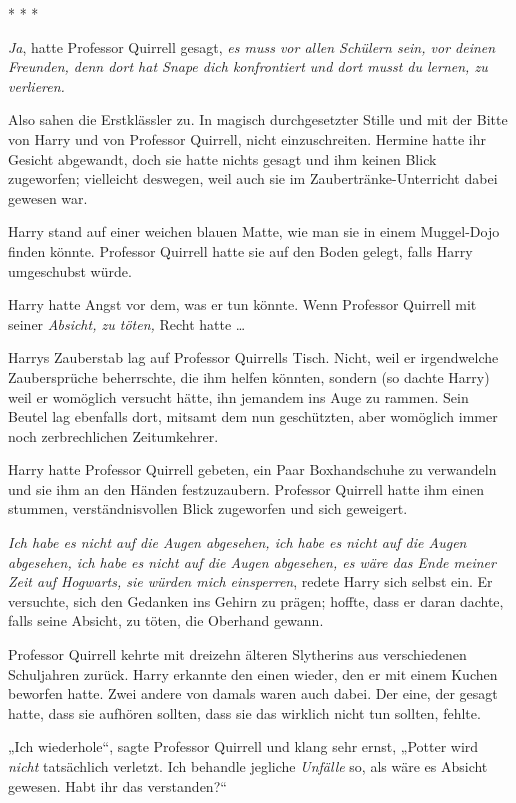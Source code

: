 {* * *

\emph{Ja}, hatte Professor Quirrell gesagt, \emph{es muss vor allen Schülern sein, vor deinen Freunden, denn dort hat Snape dich konfrontiert und dort musst du lernen, zu verlieren.}

Also sahen die Erstklässler zu. In magisch durchgesetzter Stille und mit der Bitte von Harry und von Professor Quirrell, nicht einzuschreiten. Hermine hatte ihr Gesicht abgewandt, doch sie hatte nichts gesagt und ihm keinen Blick zugeworfen; vielleicht deswegen, weil auch sie im Zaubertränke-Unterricht dabei gewesen war.

Harry stand auf einer weichen blauen Matte, wie man sie in einem Muggel-Dojo finden könnte. Professor Quirrell hatte sie auf den Boden gelegt, falls Harry umgeschubst würde.

Harry hatte Angst vor dem, was er tun könnte. Wenn Professor Quirrell mit seiner \emph{Absicht, zu töten,} Recht hatte …

Harrys Zauberstab lag auf Professor Quirrells Tisch. Nicht, weil er irgendwelche Zaubersprüche beherrschte, die ihm helfen könnten, sondern (so dachte Harry) weil er womöglich versucht hätte, ihn jemandem ins Auge zu rammen. Sein Beutel lag ebenfalls dort, mitsamt dem nun geschützten, aber womöglich immer noch zerbrechlichen Zeitumkehrer.

Harry hatte Professor Quirrell gebeten, ein Paar Boxhandschuhe zu verwandeln und sie ihm an den Händen festzuzaubern. Professor Quirrell hatte ihm einen stummen, verständnisvollen Blick zugeworfen und sich geweigert.

\emph{Ich habe es nicht auf die Augen abgesehen, ich habe es nicht auf die Augen abgesehen, ich habe es nicht auf die Augen abgesehen, es wäre das Ende meiner Zeit auf Hogwarts, sie würden mich einsperren}, redete Harry sich selbst ein. Er versuchte, sich den Gedanken ins Gehirn zu prägen; hoffte, dass er daran dachte, falls seine Absicht, zu töten, die Oberhand gewann.

Professor Quirrell kehrte mit dreizehn älteren Slytherins aus verschiedenen Schuljahren zurück. Harry erkannte den einen wieder, den er mit einem Kuchen beworfen hatte. Zwei andere von damals waren auch dabei. Der eine, der gesagt hatte, dass sie aufhören sollten, dass sie das wirklich nicht tun sollten, fehlte.

„Ich wiederhole“, sagte Professor Quirrell und klang sehr ernst, „Potter wird \emph{nicht} tatsächlich verletzt. Ich behandle jegliche \emph{Unfälle} so, als wäre es Absicht gewesen. Habt ihr das verstanden?“

}

